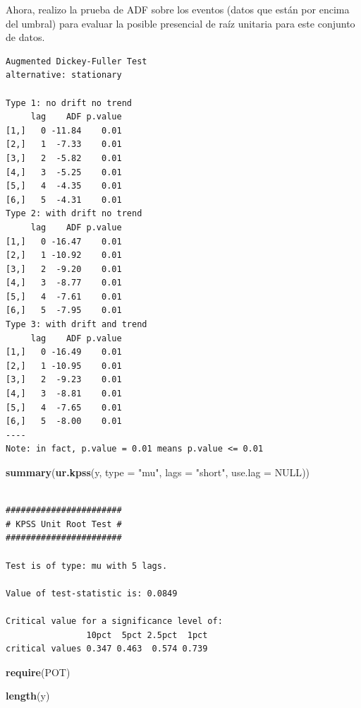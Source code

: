\documentclass[
  12pt]{article}
\newenvironment{Shaded}{\begin{snugshade}}{\end{snugshade}}
\newcommand{\AttributeTok}[1]{\textcolor[rgb]{0.13,0.29,0.53}{#1}}
\newcommand{\ConstantTok}[1]{\textcolor[rgb]{0.56,0.35,0.01}{#1}}
\newcommand{\FunctionTok}[1]{\textcolor[rgb]{0.13,0.29,0.53}{\textbf{#1}}}
\newcommand{\NormalTok}[1]{#1}
\newcommand{\StringTok}[1]{\textcolor[rgb]{0.31,0.60,0.02}{#1}}
\begin{document}
Ahora, realizo la prueba de ADF sobre los eventos (datos que están por
encima del umbral) para evaluar la posible presencial de raíz unitaria
para este conjunto de datos.

\begin{verbatim}
Augmented Dickey-Fuller Test 
alternative: stationary 
 
Type 1: no drift no trend 
     lag    ADF p.value
[1,]   0 -11.84    0.01
[2,]   1  -7.33    0.01
[3,]   2  -5.82    0.01
[4,]   3  -5.25    0.01
[5,]   4  -4.35    0.01
[6,]   5  -4.31    0.01
Type 2: with drift no trend 
     lag    ADF p.value
[1,]   0 -16.47    0.01
[2,]   1 -10.92    0.01
[3,]   2  -9.20    0.01
[4,]   3  -8.77    0.01
[5,]   4  -7.61    0.01
[6,]   5  -7.95    0.01
Type 3: with drift and trend 
     lag    ADF p.value
[1,]   0 -16.49    0.01
[2,]   1 -10.95    0.01
[3,]   2  -9.23    0.01
[4,]   3  -8.81    0.01
[5,]   4  -7.65    0.01
[6,]   5  -8.00    0.01
---- 
Note: in fact, p.value = 0.01 means p.value <= 0.01 
\end{verbatim}

\begin{Shaded}
\begin{Highlighting}[]
\FunctionTok{summary}\NormalTok{(}\FunctionTok{ur.kpss}\NormalTok{(y, }\AttributeTok{type =} \StringTok{"mu"}\NormalTok{, }\AttributeTok{lags =} \StringTok{"short"}\NormalTok{,}
        \AttributeTok{use.lag =} \ConstantTok{NULL}\NormalTok{))}
\end{Highlighting}
\end{Shaded}

\begin{verbatim}

####################### 
# KPSS Unit Root Test # 
####################### 

Test is of type: mu with 5 lags. 

Value of test-statistic is: 0.0849 

Critical value for a significance level of: 
                10pct  5pct 2.5pct  1pct
critical values 0.347 0.463  0.574 0.739
\end{verbatim}

\begin{Shaded}
\begin{Highlighting}[]
\FunctionTok{require}\NormalTok{(POT)}
\end{Highlighting}
\end{Shaded}

\begin{Shaded}
\begin{Highlighting}[]
\FunctionTok{length}\NormalTok{(y)}
\end{Highlighting}
\end{Shaded}
\end{document}
